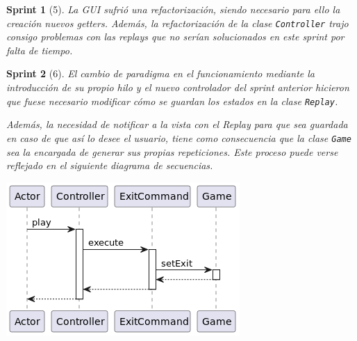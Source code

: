 \documentclass[12pt,a4paper,openright]{book}
\theoremstyle{break}
\newtheorem*{sprint}{Sprint}
\begin{document}
\begin{sprint}[5]
La GUI sufrió una refactorización, siendo necesario para ello la creación nuevos getters. Además, la refactorización  de la clase \texttt{Controller} trajo consigo problemas con las \textit{replays} que no serían solucionados en este sprint por falta de tiempo.
\end{sprint}

\begin{sprint}[6]
El cambio de paradigma en el funcionamiento mediante la introducción de su propio hilo y el nuevo controlador del sprint anterior hicieron que fuese necesario modificar cómo se guardan los estados en la clase \texttt{Replay}.

Además, la necesidad de notificar a la vista con el Replay para que sea guardada en caso de que así lo desee el usuario, tiene como consecuencia que la clase \texttt{Game} sea la encargada de generar sus propias repeticiones. Este proceso puede verse reflejado en el siguiente diagrama de secuencias.
\begin{center}
\includegraphics[scale=0.5]{addState-replay-sprint-6.png}
\end{center}

\end{sprint}
\end{document}
